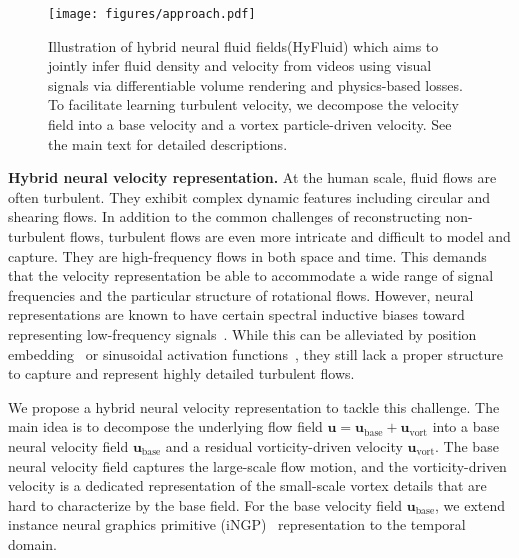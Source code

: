 \documentclass{article}
\newcommand{\modelfull}{hybrid neural fluid fields\xspace}
\newcommand{\model}{HyFluid\xspace}
\newcommand{\myparagraph}[1]{\vspace{0.1cm}\noindent\textbf{#1}}
\begin{document}
\begin{figure}[t]
\centering
\texttt{[image: figures/approach.pdf]}
\caption{Illustration of \modelfull (\model) which aims to jointly infer fluid density and velocity from videos using visual signals via differentiable volume rendering and physics-based losses. To facilitate learning turbulent velocity, we decompose the velocity field into a base velocity and a vortex particle-driven velocity. See the main text for detailed descriptions.}
\label{fig:approach}
\end{figure} \myparagraph{Hybrid neural velocity representation.}
At the human scale, fluid flows are often turbulent. They exhibit complex dynamic features including circular and shearing flows. In addition to the common challenges of reconstructing non-turbulent flows, turbulent flows are even more intricate and difficult to model and capture. They are high-frequency flows in both space and time. This demands that the velocity representation be able to accommodate a wide range of signal frequencies and the particular structure of rotational flows. However, neural representations are known to have certain spectral inductive biases toward representing low-frequency signals~\citep{rahaman2019spectral}. While this can be alleviated by position embedding~\citep{tancik2020fourier} or sinusoidal activation functions~\citep{sitzmann2020implicit}, they still lack a proper structure to capture and represent highly detailed turbulent flows.

We propose a hybrid neural velocity representation to tackle this challenge. The main idea is to decompose the underlying flow field $\mathbf{u}=\mathbf{u}_\text{base}+\mathbf{u}_\text{vort}$ into a base neural velocity field $\mathbf{u}_\text{base}$ and a residual vorticity-driven velocity $\mathbf{u}_\text{vort}$. The base neural velocity field captures the large-scale flow motion, and the vorticity-driven velocity is a dedicated representation of the small-scale vortex details that are hard to characterize by the base field. For the base velocity field $\mathbf{u}_\text{base}$, we extend instance neural graphics primitive (iNGP)~\citep{muller2022instant} representation to the temporal domain. 
\end{document}
